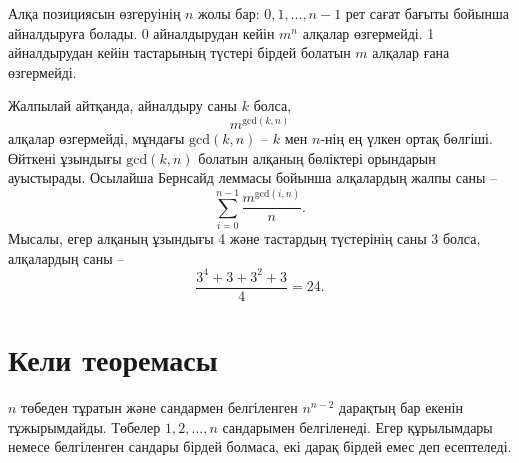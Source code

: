 Алқа позициясын өзгеруінің $n$ жолы бар:
$0,1,\ldots,n-1$ рет сағат бағыты бойынша айналдыруға 
болады. 0 айналдырудан кейін
$m^n$ алқалар өзгермейді. 1 айналдырудан кейін тастарының 
түстері бірдей болатын $m$ алқалар ғана өзгермейді. 


Жалпылай айтқанда, айналдыру саны $k$ болса, 
\[m^{\textrm{gcd}(k,n)}\]
алқалар өзгермейді, мұндағы $\textrm{gcd}(k,n)$
-- $k$ мен $n$-нің ең үлкен ортақ бөлгіші. Өйткені
ұзындығы $\textrm{gcd}(k,n)$ болатын алқаның бөліктері
орындарын ауыстырады. Осылайша Бернсайд леммасы бойынша
алқалардың жалпы саны --
\[\sum_{i=0}^{n-1} \frac{m^{\textrm{gcd}(i,n)}}{n}. \]
Мысалы, егер алқаның ұзындығы 4 және тастардың түстерінің саны
3 болса, алқалардың саны --
\[\frac{3^4+3+3^2+3}{4} = 24. \]


\section{Кели теоремасы}


$n$ төбеден тұратын және сандармен белгіленген
$n^{n-2}$ дарақтың бар екенін тұжырымдайды. Төбелер 
$1,2,\ldots,n$ сандарымен белгіленеді. 
Егер 
құрылымдары немесе белгіленген сандары бірдей болмаса, екі дарақ бірдей емес деп есептеледі.


